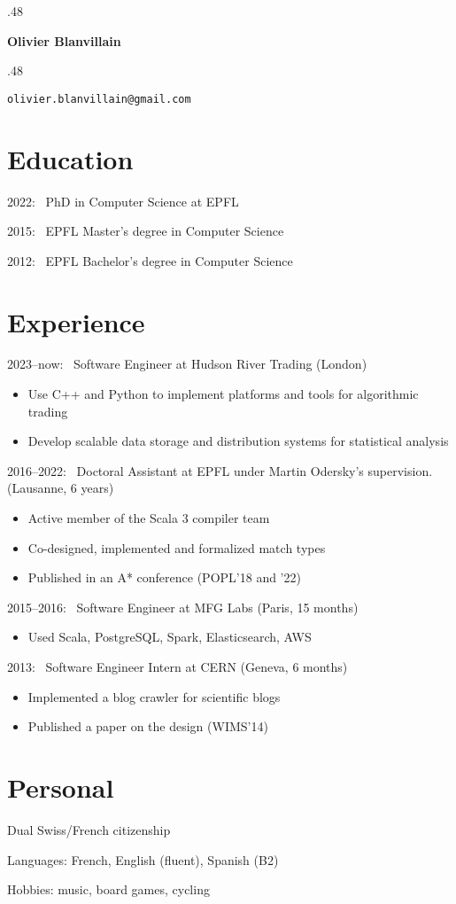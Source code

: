 \documentclass[marginmode, 12pt]{res}
\newcommand{\centered}[1]{\moveleft.48\hoffset\centerline{#1}}
\begin{document}
\centered{\LARGE\textbf{Olivier Blanvillain}}
\centered{\texttt{olivier.blanvillain@gmail.com}}

\begin{resume}

\section{Education}

2022:~ PhD in Computer Science at EPFL

2015:~ EPFL Master's degree in Computer Science

2012:~ EPFL Bachelor's degree in Computer Science

\section{Experience}

2023--now:~ Software Engineer at Hudson River Trading (London)

\begin{itemize}
  \item Use C++ and Python to implement platforms and tools for \mbox{algorithmic} trading
  \item Develop scalable data storage and distribution systems for statistical analysis
\end{itemize}

2016--2022:~ Doctoral Assistant at EPFL under Martin Odersky's supervision. (Lausanne, 6 years)

\begin{itemize}
  \item Active member of the Scala 3 compiler team
  \item Co-designed, implemented and formalized match types
  \item Published in an A* conference (POPL'18 and '22)
\end{itemize}

2015--2016:~ Software Engineer at MFG Labs (Paris, 15 months)

\begin{itemize}
  \item Used Scala, PostgreSQL, Spark, Elasticsearch, AWS
\end{itemize}

2013:~ Software Engineer Intern at CERN (Geneva, 6 months)

\begin{itemize}
  \item Implemented a blog crawler for scientific blogs
  \item Published a paper on the design (WIMS'14)
\end{itemize}

\section{Personal}

Dual Swiss/French citizenship

Languages: French, English (fluent), Spanish (B2)

Hobbies: music, board games, cycling

\end{resume}
\end{document}
